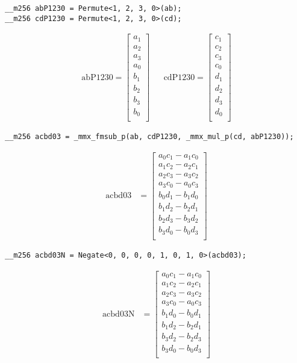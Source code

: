 \begin{verbatim}
__m256 abP1230 = Permute<1, 2, 3, 0>(ab);
__m256 cdP1230 = Permute<1, 2, 3, 0>(cd);
\end{verbatim}
\begin{align*}
\mathrm{abP1230} 
=
\begin{bmatrix}
a_1\\
a_2\\
a_3\\
a_0\\
b_1\\
b_2\\
b_3\\
b_0\\
\end{bmatrix}
&&
\mathrm{cdP1230} 
=
\begin{bmatrix}
c_1\\
c_2\\
c_3\\
c_0\\
d_1\\
d_2\\
d_3\\
d_0\\
\end{bmatrix}
\end{align*}



\begin{verbatim}
__m256 acbd03 = _mmx_fmsub_p(ab, cdP1230, _mmx_mul_p(cd, abP1230)); 
\end{verbatim}
\begin{align*}
\mathrm{acbd03} 
&=
\begin{bmatrix}
a_0c_1 - a_1c_0\\
a_1c_2 - a_2c_1\\
a_2c_3 - a_3c_2\\
a_3c_0 - a_0c_3\\
b_0d_1 - b_1d_0\\
b_1d_2 - b_2d_1\\
b_2d_3 - b_3d_2\\
b_3d_0 - b_0d_3\\
\end{bmatrix}
\end{align*}



\begin{verbatim}
__m256 acbd03N = Negate<0, 0, 0, 0, 1, 0, 1, 0>(acbd03);
\end{verbatim}
\begin{align*}
\mathrm{acbd03N} 
&=
\begin{bmatrix}
a_0c_1 - a_1c_0\\
a_1c_2 - a_2c_1\\
a_2c_3 - a_3c_2\\
a_3c_0 - a_0c_3\\
b_1d_0 - b_0d_1\\
b_1d_2 - b_2d_1\\
b_3d_2 - b_2d_3\\
b_3d_0 - b_0d_3\\
\end{bmatrix}
\end{align*}



